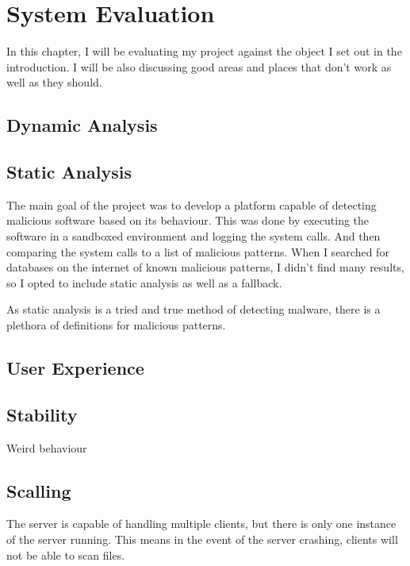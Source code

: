 \chapter{System Evaluation}

In this chapter, I will be evaluating my project against the
object I set out in the introduction.
I will be also discussing good areas and places that don't work as well as they should.

\section{Dynamic Analysis}

\section{Static Analysis}
The main goal of the project was to develop a platform capable
of detecting malicious software based on its behaviour.
This was done by executing the software in a sandboxed
environment and logging the system calls.
And then comparing the system calls to a list of malicious patterns.
When I searched for databases on the internet of known malicious patterns,
I didn't find many results, so I opted to include static analysis as well as a fallback.

As static analysis is a tried and true method of detecting malware,
there is a plethora of definitions for malicious patterns.

\section{User Experience}

\section{Stability}
Weird behaviour

\section{Scalling}
The server is capable of handling multiple clients,
but there is only one instance of the server running.
This means in the event of the server crashing, clients will not be able to scan files.

